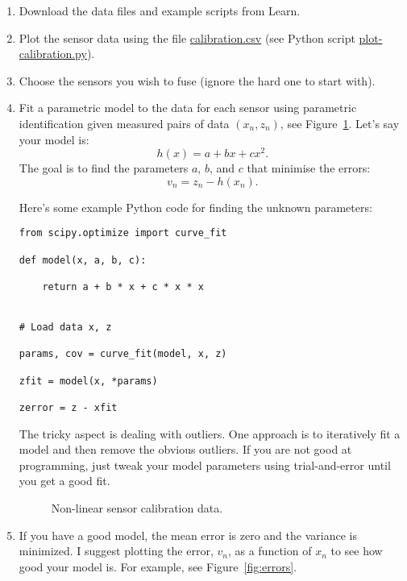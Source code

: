 \documentclass[a4paper, 12]{article}
\newcommand{\reffig}[1]{\mbox{Figure~\ref{fig:#1}}}
\begin{document}
  
\begin{enumerate}
\item Download the data files and example scripts from Learn.
  
\item Plot the sensor data using the file \url{calibration.csv} (see
  Python script \url{plot-calibration.py}). 

\item Choose the sensors you wish to fuse (ignore the hard one to
  start with).

 
\item Fit a parametric model to the data for each sensor using
  parametric identification given measured pairs of data $(x_n, z_n)$,
  see \reffig{fit}.  Let's say your model is:
  \begin{equation}
    h(x) = a + b x + c x^2.
  \end{equation}
  The goal is to find the parameters $a$, $b$, and $c$ that minimise
  the errors:
    \begin{equation}
    v_n = z_n - h(x_n).
    \end{equation}

    Here's some example Python code for finding the unknown parameters:
%
\begin{verbatim}
from scipy.optimize import curve_fit

def model(x, a, b, c):

    return a + b * x + c * x * x

    
# Load data x, z

params, cov = curve_fit(model, x, z)    

zfit = model(x, *params)

zerror = z - xfit
\end{verbatim}

  The tricky aspect is dealing with outliers.  One approach is to
  iteratively fit a model and then remove the obvious outliers.  If
  you are not good at programming, just tweak your model parameters
  using trial-and-error until you get a good fit.

  \begin{figure}[!h]
  \centering
  
  \caption{Non-linear sensor calibration data.}
  \label{fig:fit}    
  \end{figure}

  
  \item If you have a good model, the mean error is zero and the
    variance is minimized.  I suggest plotting the error, $v_n$, as a
    function of $x_n$ to see how good your model is.  For example, see
    \reffig{errors}.


\end{enumerate}
\end{document}
